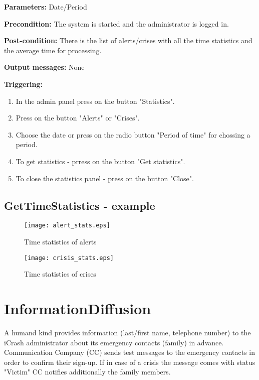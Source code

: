 \begin{description}
	\item \textbf{Parameters:} Date/Period
	\item \textbf{Precondition:} The system is started and the administrator is
	logged in.
	\item \textbf{Post-condition:} There is the list of alerts/crises with all the
	time statistics and the average time for processing.
	\item \textbf{Output messages:} None
	
	\item \textbf{Triggering:}
	
	\begin{enumerate}
		\item In the admin panel press on the button "Statistics".
		\item Press on the button "Alerts" or "Crises".
		\item Choose the date or press on the radio button "Period of time" for
		chossing a period.
		\item To get statistics - prress on the button "Get statistics".
		\item To close the statistics panel - press on the button "Close".
	\end{enumerate}
\end{description}

\subsection{GetTimeStatistics - example}

\begin{figure}[h]
    \texttt{[image: alert\_stats.eps]}
	\caption{Time statistics of alerts}
\end{figure}

\begin{figure}[h] 
    \texttt{[image: crisis\_stats.eps]}
	\caption{Time statistics of crises}
\end{figure}


\section{InformationDiffusion}
\label{operation:InformationDiffusion}

A humand kind provides information (last/first name, telephone number) to the
iCrash administrator about its emergency contacts (family) in advance.
Communication Company (CC) sends test messages to the emergency contacts in
order to confirm their sign-up.
If in case of a crisis the message comes with status "Victim" CC notifies
additionally the family members.

